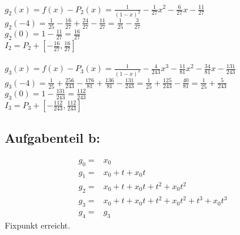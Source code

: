 $g_2(x) =f(x) - P_2(x)= \frac{1}{(1-x)^2}-\frac{1}{27} x^2 - \frac{6}{27} x - \frac{11}{27}$\\
$g_2(-4)=\frac{1}{25}-\frac{16}{27}+\frac{24}{27}-\frac{11}{27}=\frac{1}{25}-\frac{3}{27}$\\
$g_2(0)=1-\frac{11}{27}=\frac{16}{27}$\\
$I_2=P_2+[-\frac{16}{27},\frac{16}{27}]$\\\\

$g_3(x) =f(x) - P_3(x)= \frac{1}{(1-x)^2}-\frac{4}{243} x^3 - \frac{11}{81} x^2 - \frac{34}{81} x - \frac{131}{243}$\\
$g_3(-4) = \frac{1}{25}+\frac{256}{243} - \frac{176}{81} + \frac{136}{81} - \frac{131}{243} =  \frac{1}{25} + \frac{125}{243} - \frac{40}{81} =  \frac{1}{25} + \frac{5}{243}$\\
$g_3(0)=1-\frac{131}{243} = \frac{112}{243}$\\
$I_3=P_3+[-\frac{112}{243},\frac{112}{243}]$
\subsection*{Aufgabenteil b:}
\begin{align*}
g_0=&x_0\\
g_1=&x_0+t+x_0t\\
g_2=&x_0+t+x_0t+t^2+x_0t^2\\
g_3=&x_0+t+x_0t+t^2+x_0t^2+t^3+x_0t^3\\
g_4=&g_3
\end{align*}
Fixpunkt erreicht.